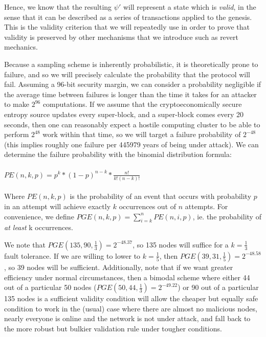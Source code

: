 \documentclass[11pt,a4paper]{article}
\theoremstyle{plain}
\theoremstyle{definition}
\theoremstyle{remark}
\begin{document}
Hence, we know that the resulting $\psi'$ will represent a state which is \emph{valid}, in the sense that it can be described as a series of transactions applied to the genesis. This is the validity criterion that we will repeatedly use in order to prove that validity is preserved by other mechanisms that we introduce such as revert mechanics.

Because a sampling scheme is inherently probabilistic, it is theoretically prone to failure, and so we will precisely calculate the probability that the protocol will fail. Assuming a 96-bit security margin, we can consider a probability negligible if the average time between failures is longer than the time it takes for an attacker to make $2^{96}$ computations. If we assume that the cryptoeconomically secure entropy source updates every super-block, and a super-block comes every 20 seconds, then one can reasonably expect a hostile computing cluster to be able to perform $2^{48}$ work within that time, so we will target a failure probability of $2^{-48}$ (this implies roughly one failure per 445979 years of being under attack). We can determine the failure probability with the binomial distribution formula:
\\
\\
$PE(n, k, p) = p^k * (1-p)^{n-k} * \frac{n!}{k!(n-k)!}$
\\
\\
Where $PE(n, k, p)$ is the probability of an event that occurs with probability $p$ in an attempt will achieve exactly $k$ occurrences out of $n$ attempts. For convenience, we define $PGE(n, k, p) = \sum_{i=k}^n PE(n, i, p)$, ie. the probability of \emph{at least} k occurrences.

We note that $PGE(135, 90, \frac{1}{3}) = 2^{-48.37}$, so 135 nodes will suffice for a $k = \frac{1}{3}$ fault tolerance. If we are willing to lower to $k = \frac{1}{5}$, then $PGE(39, 31, \frac{1}{5}) = 2^{-48.58}$, so 39 nodes will be sufficient. Additionally, note that if we want greater efficiency under normal circumstances, then a bimodal scheme where either 44 out of a particular 50 nodes ($PGE(50, 44, \frac{1}{3}) = 2^{-49.22}$) or 90 out of a particular 135 nodes is a sufficient validity condition will allow the cheaper but equally safe condition to work in the (usual) case where there are almost no malicious nodes, nearly everyone is online and the network is not under attack, and fall back to the more robust but bulkier validation rule under tougher conditions.
\end{document}
